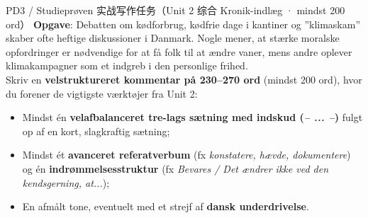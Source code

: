 \begin{emailbox}{PD3 / Studieprøven 实战写作任务（Unit 2 综合 Kronik-indlæg · mindst 200 ord）}
\textbf{Opgave}: Debatten om kødforbrug, kødfrie dage i kantiner og ”klimaskam” skaber ofte heftige diskussioner i Danmark. Nogle mener, at stærke moralske opfordringer er nødvendige for at få folk til at ændre vaner, mens andre oplever klimakampagner som et indgreb i den personlige frihed.\\[3pt]
Skriv en \textbf{velstruktureret kommentar på 230--270 ord} (mindst 200 ord), hvor du forener de vigtigste værktøjer fra Unit 2:
\begin{itemize}
  \item Mindst én \textbf{velafbalanceret tre-lags sætning med indskud (\textit{-- ... --})} fulgt op af en kort, slagkraftig sætning;
  \item Mindst ét \textbf{avanceret referatverbum} (fx \textit{konstatere, hævde, dokumentere}) og én \textbf{indrømmelsesstruktur} (fx \textit{Bevares / Det ændrer ikke ved den kendsgerning, at...});
  \item En afmålt tone, eventuelt med et strejf af \textbf{dansk underdrivelse}.
\end{itemize}
\end{emailbox}

